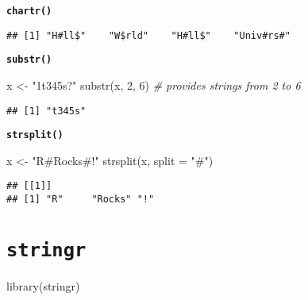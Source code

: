 \documentclass[
]{book}
\newenvironment{Shaded}{\begin{snugshade}}{\end{snugshade}}
\newcommand{\AttributeTok}[1]{\textcolor[rgb]{0.77,0.63,0.00}{#1}}
\newcommand{\CommentTok}[1]{\textcolor[rgb]{0.56,0.35,0.01}{\textit{#1}}}
\newcommand{\DecValTok}[1]{\textcolor[rgb]{0.00,0.00,0.81}{#1}}
\newcommand{\FunctionTok}[1]{\textcolor[rgb]{0.00,0.00,0.00}{#1}}
\newcommand{\NormalTok}[1]{#1}
\newcommand{\OtherTok}[1]{\textcolor[rgb]{0.56,0.35,0.01}{#1}}
\newcommand{\StringTok}[1]{\textcolor[rgb]{0.31,0.60,0.02}{#1}}
\begin{document}
{\textbf{\texttt{chartr()}
}}

\begin{Shaded}
\end{Shaded}

\begin{verbatim}
## [1] "H#ll$"    "W$rld"    "H#ll$"    "Univ#rs#"
\end{verbatim}

{\textbf{\texttt{substr()}
}}

\begin{Shaded}
\begin{Highlighting}[]
\NormalTok{x }\OtherTok{\textless{}{-}} \StringTok{"1t345s?"}
\FunctionTok{substr}\NormalTok{(x, }\DecValTok{2}\NormalTok{, }\DecValTok{6}\NormalTok{) }\CommentTok{\# provides strings from 2 to 6}
\end{Highlighting}
\end{Shaded}

\begin{verbatim}
## [1] "t345s"
\end{verbatim}

{\textbf{\texttt{strsplit()}
}}

\begin{Shaded}
\begin{Highlighting}[]
\NormalTok{x }\OtherTok{\textless{}{-}} \StringTok{"R\#Rocks\#!"}
\FunctionTok{strsplit}\NormalTok{(x, }\AttributeTok{split =} \StringTok{"\#"}\NormalTok{)}
\end{Highlighting}
\end{Shaded}

\begin{verbatim}
## [[1]]
## [1] "R"     "Rocks" "!"
\end{verbatim}

\hypertarget{stringr}{%
\section{\texorpdfstring{\texttt{stringr}}{stringr}}\label{stringr}}

\begin{Shaded}
\begin{Highlighting}[]
\FunctionTok{library}\NormalTok{(stringr)}
\end{Highlighting}
\end{Shaded}
\end{document}
